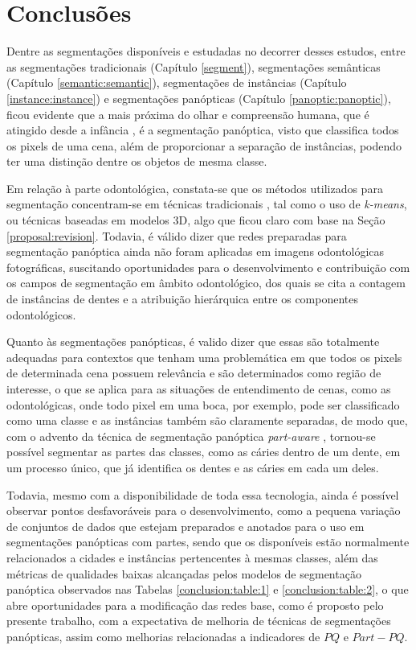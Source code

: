 \newpage
\clearpage
\section{Conclusões}
\label{final:final}

Dentre as segmentações disponíveis e estudadas no decorrer desses estudos, entre as segmentações tradicionais (Capítulo \ref{segment}), segmentações semânticas (Capítulo \ref{semantic:semantic}), segmentações de instâncias (Capítulo \ref{instance:instance}) e segmentações panópticas (Capítulo \ref{panoptic:panoptic}), ficou evidente que a mais próxima do olhar e compreensão humana, que é atingido desde a infância \cite{Mohan2020}, é a segmentação panóptica, visto que classifica todos os pixels de uma cena, além de proporcionar a separação de instâncias, podendo ter uma distinção dentre os objetos de mesma classe.

Em relação à parte odontológica, constata-se que os métodos utilizados para segmentação concentram-se em técnicas tradicionais \cite{Hammad2020}, tal como o uso de \textit{k-means}, ou técnicas baseadas em modelos 3D, algo que ficou claro com base na Seção \ref{proposal:revision}. Todavia, é válido dizer que redes preparadas para segmentação panóptica ainda não foram aplicadas em imagens odontológicas fotográficas, suscitando oportunidades para o desenvolvimento e contribuição com os campos de segmentação em âmbito odontológico, dos quais se cita a contagem de instâncias de dentes e a atribuição hierárquica entre os componentes odontológicos.

Quanto às segmentações panópticas, é valido dizer que essas são totalmente adequadas para contextos que tenham uma problemática em que todos os pixels de determinada cena possuem relevância e são determinados como região de interesse, o que se aplica para as situações de entendimento de cenas, como as odontológicas, onde todo pixel em uma boca, por exemplo, pode ser classificado como uma classe e as instâncias também são claramente separadas, de modo que, com o advento da técnica de segmentação panóptica \textit{part-aware} \cite{DeGeus2021}, tornou-se possível segmentar as partes das classes, como as cáries dentro de um dente, em um processo único, que já identifica os dentes e as cáries em cada um deles.

Todavia, mesmo com a disponibilidade de toda essa tecnologia, ainda é possível observar pontos desfavoráveis para o desenvolvimento, como a pequena variação de conjuntos de dados que estejam preparados e anotados para o uso em segmentações panópticas com partes, sendo que os disponíveis estão normalmente relacionados a cidades e instâncias pertencentes à mesmas classes, além das métricas de qualidades baixas alcançadas pelos modelos de segmentação panóptica observados nas Tabelas \ref{conclusion:table:1} e \ref{conclusion:table:2}, o que abre oportunidades para a modificação das redes base, como é proposto pelo presente trabalho, com a expectativa de melhoria de técnicas de segmentações panópticas, assim como melhorias relacionadas a indicadores de $PQ$ e $Part-PQ$.

